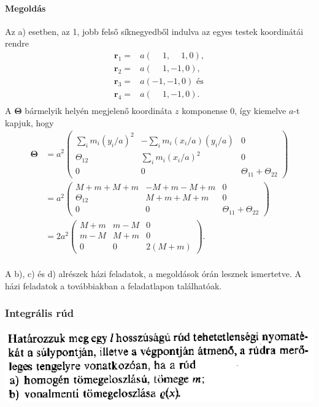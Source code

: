 \documentclass[12pt,a4paper]{scrartcl}
\let\mathbf\bm
\begin{document}
\paragraph{Megoldás}
Az a) esetben, az 1, jobb felső síknegyedből indulva az egyes testek koordinátái rendre
\[\begin{aligned}
  {{\mathbf{r}}_1} =  & a\left( {\phantom{-}1,\phantom{-}1,0} \right), \\ 
  {{\mathbf{r}}_2} =  & a\left( {\phantom{-}1, - 1,0} \right), \\ 
  {{\mathbf{r}}_3} =  & a\left( { - 1, - 1,0} \right) \text{ és} \\ 
  {{\mathbf{r}}_4} =  & a\left( {\phantom{-}1, - 1,0} \right). \\ 
\end{aligned} \]
A ${\mathbf{\Theta }}$ bármelyik helyén megjelenő koordináta $z$ komponense 0, így kiemelve $a$-t kapjuk, hogy 
\[\begin{aligned}
  {\mathbf{\Theta }} &  = {a^2}\left( {\begin{array}{*{20}{c}}
  {\sum\limits_i {{m_i}{{\left( {{y_i}/a} \right)}^2}} }&{ - \sum\limits_i {{m_i}\left( {{x_i}/a} \right)\left( {{y_i}/a} \right)} }&0 \\ 
  {{\Theta _{12}}}&{\sum\limits_i {{m_i}{{\left( {{x_i}/a} \right)}^2}} }&0 \\ 
  0&0&{{\Theta _{11}} + {\Theta _{22}}} 
\end{array}} \right) \\ 
   &  = {a^2}\left( {\begin{array}{*{20}{c}}
  {M + m + M + m}&{ - M + m - M + m}&0 \\ 
  {{\Theta _{12}}}&{M + m + M + m}&0 \\ 
  0&0&{{\Theta _{11}} + {\Theta _{22}}} 
\end{array}} \right) \\ 
   &  = 2{a^2}\left( {\begin{array}{*{20}{c}}
  {M + m}&{m - M}&0 \\ 
  {m - M}&{M + m}&0 \\ 
  0&0&{2\left( {M + m} \right)} 
\end{array}} \right). \\ 
\end{aligned} \]

A b), c) és d) alrészek házi feladatok, a megoldások órán lesznek ismertetve. A házi feladatok a továbbiakban a feladatlapon találhatóak.

\subsubsection{Integrális rúd}
\includegraphics[scale=0.8]{lusta/merev_test2pelda.png} 
\end{document}
